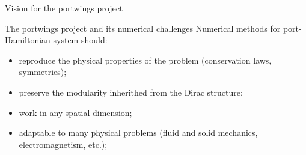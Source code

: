 \documentclass[aspectratio=169]{beamer}
\begin{document}
\begin{frame}{Vision for the portwings project}
	
\end{frame}

\begin{frame}{The portwings project and its numerical challenges}
	Numerical methods for port-Hamiltonian system should:
	\begin{itemize}
		\item reproduce the physical properties of the problem (conservation laws, symmetries);
		\item preserve the modularity inherithed from the Dirac structure;
		\item work in any spatial dimension;
		\item adaptable to many physical problems (fluid and solid mechanics, electromagnetism, etc.);
	\end{itemize}
\end{frame}
\end{document}

